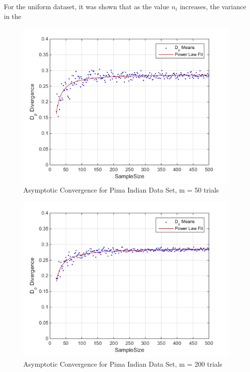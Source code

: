 \documentclass{article}
\begin{document}
	For the uniform dataset, it was shown that as the value $n_i$ increases, the variance in the
	\begin{figure}[!h]
		\caption{Asymptotic Convergence for Pima Indian Data Set, m = 50 trials}
		\centering
		\includegraphics[scale=0.6]{dp_n50_pima}
	\end{figure}
	\begin{figure}[!h]
		\caption{Asymptotic Convergence for Pima Indian Data Set, m = 200 trials}
		\centering
		\includegraphics[scale=0.6]{dp_n200_pima}
	\end{figure}	
\end{document}
